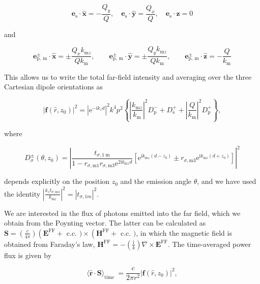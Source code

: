 \documentclass[10pt]{article}
\begin{document}
$$
\mathbf{e}_{\mathrm{s}} \cdot \widehat{\boldsymbol{x}}=-\frac{Q_{y}}{Q}, \quad \mathbf{e}_{\mathrm{s}} \cdot \widehat{\boldsymbol{y}}=\frac{Q_{x}}{Q}, \quad \mathbf{e}_{\mathrm{s}} \cdot \hat{\boldsymbol{z}}=0
$$

and

$$
\mathbf{e}_{\mathrm{p}, \mathrm{~m}}^{ \pm} \cdot \widehat{\boldsymbol{x}}= \pm \frac{Q_{x} k_{\mathrm{m} z}}{Q k_{\mathrm{m}}}, \quad \quad \mathbf{e}_{\mathrm{p}, \mathrm{~m}}^{ \pm} \cdot \widehat{\boldsymbol{y}}= \pm \frac{Q_{y} k_{\mathrm{m} z}}{Q k_{\mathrm{m}}}, \quad \quad \mathbf{e}_{\mathrm{p}, \mathrm{~m}}^{ \pm} \cdot \hat{\boldsymbol{z}}=-\frac{Q}{k_{\mathrm{m}}}
$$

This allows us to write the total far-field intensity and averaging over the three Cartesian dipole orientations as

$$
\left|\boldsymbol{f}\left(\hat{r}, z_{0}\right)\right|^{2}=\left|\mathrm{e}^{-\mathrm{i} k_{z} d}\right|^{2} k^{4} p^{2}\left\{\left|\frac{k_{\mathrm{m} z}}{k_{\mathrm{m}}}\right|^{2} D_{\mathrm{p}}^{-}+D_{\mathrm{s}}^{+}+\left|\frac{Q}{k_{\mathrm{m}}}\right|^{2} D_{\mathrm{p}}^{+}\right\},
$$

where

$$
D_{\sigma}^{ \pm}\left(\theta, z_{0}\right)=\left|\frac{t_{\sigma, 1 \mathrm{~m}}}{1-r_{\sigma, \mathrm{m} 1} r_{\sigma, \mathrm{m} 3} \mathrm{e}^{2 \mathrm{i} k_{\mathrm{m} z} d}}\left[\mathrm{e}^{\mathrm{i} k_{\mathrm{m} z}\left(d-z_{0}\right)} \pm r_{\sigma, \mathrm{m} 3} \mathrm{e}^{\mathrm{i} k_{\mathrm{m} z}\left(d+z_{0}\right)}\right]\right|^{2}
$$

depends explicitly on the position $z_{0}$ and the emission angle $\theta$, and we have used the identity $\left|\frac{k_{z} t_{\sigma, \mathrm{m} 1}}{k_{\mathrm{m} z}}\right|^{2}=\left|t_{\sigma, 1 m}\right|^{2}$.

We are interested in the flux of photons emitted into the far field, which we obtain from the Poynting vector. The latter can be calculated as $\mathbf{S}=\left(\frac{c}{4 \pi}\right)\left(\mathbf{E}^{\mathrm{FF}}+\right.$ c.c. $) \times\left(\mathbf{H}^{\mathrm{FF}}+\right.$ c.c. $)$, in which the magnetic field is obtained from Faraday's law, $\mathbf{H}^{\mathrm{FF}}=-\left(\frac{\mathrm{i}}{k}\right) \nabla \times \mathbf{E}^{\mathrm{FF}}$. The time-averaged power flux is given by

$$
\langle\hat{\boldsymbol{r}} \cdot \boldsymbol{S}\rangle_{\text {time }}=\frac{c}{2 \pi r^{2}}\left|\boldsymbol{f}\left(\hat{r}, z_{0}\right)\right|^{2},
$$
\end{document}
